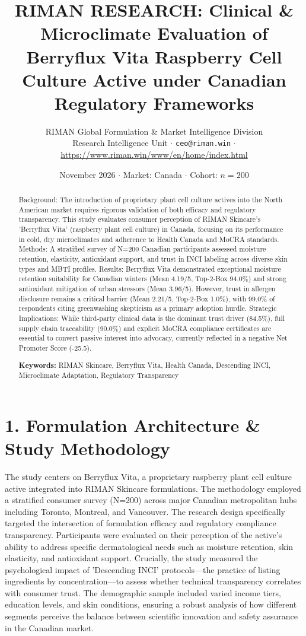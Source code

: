 \documentclass[10pt,twocolumn,a4paper]{article}
\title{\textbf{RIMAN RESEARCH: Clinical \& Microclimate Evaluation of Berryflux Vita Raspberry Cell Culture Active under Canadian Regulatory Frameworks}}
\author{RIMAN Global Formulation \& Market Intelligence Division\\
\small Research Intelligence Unit $\cdot$ \texttt{ceo@riman.win} $\cdot$ \url{https://www.riman.win/www/en/home/index.html}}
\date{November 2026 \quad $\cdot$ \quad Market: Canada \quad $\cdot$ \quad Cohort: $n = 200$}
\begin{document}
\maketitle

\begin{abstract}
Background: The introduction of proprietary plant cell culture actives into the North American market requires rigorous validation of both efficacy and regulatory transparency. This study evaluates consumer perception of RIMAN Skincare's 'Berryflux Vita' (raspberry plant cell culture) in Canada, focusing on its performance in cold, dry microclimates and adherence to Health Canada and MoCRA standards. Methods: A stratified survey of N=200 Canadian participants assessed moisture retention, elasticity, antioxidant support, and trust in INCI labeling across diverse skin types and MBTI profiles. Results: Berryflux Vita demonstrated exceptional moisture retention suitability for Canadian winters (Mean 4.19/5, Top-2-Box 94.0\%) and strong antioxidant mitigation of urban stressors (Mean 3.96/5). However, trust in allergen disclosure remains a critical barrier (Mean 2.21/5, Top-2-Box 1.0\%), with 99.0\% of respondents citing greenwashing skepticism as a primary adoption hurdle. Strategic Implications: While third-party clinical data is the dominant trust driver (84.5\%), full supply chain traceability (90.0\%) and explicit MoCRA compliance certificates are essential to convert passive interest into advocacy, currently reflected in a negative Net Promoter Score (-25.5).

\vspace{0.4em}
\noindent\textbf{Keywords:} RIMAN Skincare, Berryflux Vita, Health Canada, Descending INCI, Microclimate Adaptation, Regulatory Transparency
\end{abstract}

\section{1. Formulation Architecture \& Study Methodology}
The study centers on Berryflux Vita, a proprietary raspberry plant cell culture active integrated into RIMAN Skincare formulations. The methodology employed a stratified consumer survey (N=200) across major Canadian metropolitan hubs including Toronto, Montreal, and Vancouver. The research design specifically targeted the intersection of formulation efficacy and regulatory compliance transparency. Participants were evaluated on their perception of the active's ability to address specific dermatological needs such as moisture retention, skin elasticity, and antioxidant support. Crucially, the study measured the psychological impact of 'Descending INCI' protocols—the practice of listing ingredients by concentration—to assess whether technical transparency correlates with consumer trust. The demographic sample included varied income tiers, education levels, and skin conditions, ensuring a robust analysis of how different segments perceive the balance between scientific innovation and safety assurance in the Canadian market.
\end{document}
